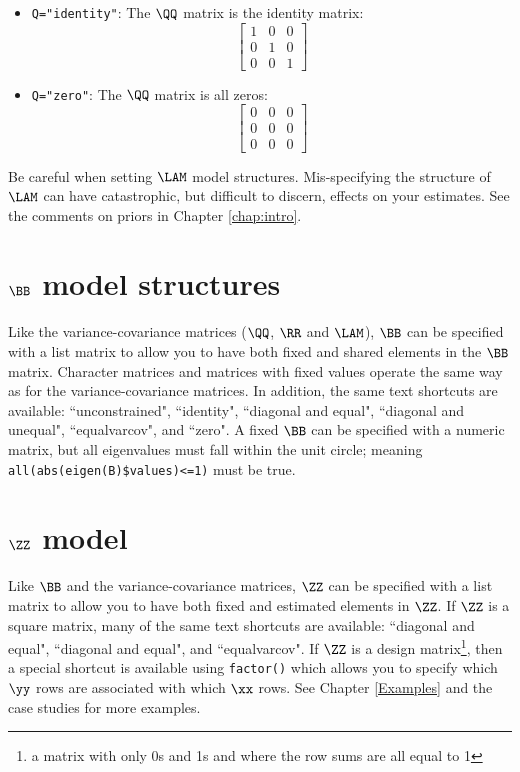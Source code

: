 \begin{itemize}
\item[] \texttt{Q="identity"}: The $\QQ$ matrix is the identity matrix:
\begin{equation*}
 \left[ \begin{array}{ccc}
    1 & 0 & 0\\
    0 & 1 & 0 \\
    0 & 0 & 1 \end{array} \right]
\end{equation*}

\item[] \texttt{Q="zero"}: The $\QQ$ matrix is all zeros:
\begin{equation*}
 \left[ \begin{array}{ccc}
    0 & 0 & 0\\
    0 & 0 & 0 \\
    0 & 0 & 0 \end{array} \right]
\end{equation*}
\end{itemize}

Be careful when setting $\LAM$ model structures.  Mis-specifying the structure of $\LAM$ can have catastrophic, but difficult to discern, effects on your estimates.  See the comments on priors in Chapter \ref{chap:intro}.

\section{$\BB$ model structures}

Like the variance-covariance matrices ($\QQ$, $\RR$ and $\LAM$), $\BB$ can be specified with a list matrix to allow you to have both fixed and shared elements in the $\BB$ matrix.  Character matrices and matrices with fixed values operate the same way as for the variance-covariance matrices.  In addition, the same text shortcuts are available: ``unconstrained", ``identity", ``diagonal and equal", ``diagonal and unequal", ``equalvarcov", and ``zero".  A fixed $\BB$ can be specified with a numeric matrix, but  all eigenvalues must fall within the unit circle; meaning \texttt{all(abs(eigen(B)\$values)<=1)} must be true.  

\section{$\ZZ$ model}

Like $\BB$ and the variance-covariance matrices, $\ZZ$ can be specified with a list matrix to allow you to have both fixed and estimated elements in $\ZZ$. If $\ZZ$ is a square matrix, many of the same text shortcuts are available: ``diagonal and equal", ``diagonal and equal", and ``equalvarcov".  If $\ZZ$ is a design matrix\footnote{a matrix with only 0s and 1s and where the row sums are all equal to 1}, then a special shortcut is available using \texttt{factor()} which allows you to specify which $\yy$ rows are associated with which $\xx$ rows.  See Chapter \ref{Examples} and the case studies for more examples.

